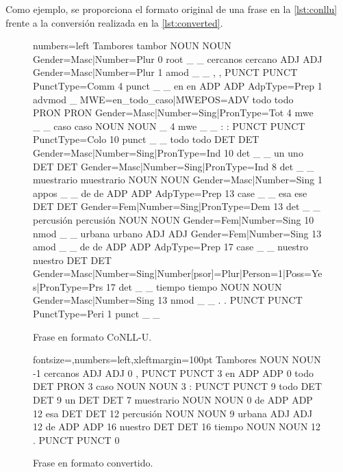Como ejemplo, se proporciona el formato original de una frase en la
\autoref{lst:conllu} frente a la conversión realizada en la
\autoref{lst:converted}.
\begin{figure}[ht]
  \begin{bashcode*}{numbers=left}
Tambores        tambor  NOUN    NOUN    Gender=Masc|Number=Plur 0       root    _       _
cercanos        cercano ADJ     ADJ     Gender=Masc|Number=Plur 1       amod    _       _
,       ,       PUNCT   PUNCT   PunctType=Comm  4       punct   _       _
en      en      ADP     ADP     AdpType=Prep    1       advmod  _       MWE=en_todo_caso|MWEPOS=ADV
todo    todo    PRON    PRON    Gender=Masc|Number=Sing|PronType=Tot    4       mwe     _       _
caso    caso    NOUN    NOUN    _       4       mwe     _       _
:       :       PUNCT   PUNCT   PunctType=Colo  10      punct   _       _
todo    todo    DET     DET     Gender=Masc|Number=Sing|PronType=Ind    10      det     _       _
un      uno     DET     DET     Gender=Masc|Number=Sing|PronType=Ind    8       det     _       _
muestrario      muestrario      NOUN    NOUN    Gender=Masc|Number=Sing 1       appos   _       _
de      de      ADP     ADP     AdpType=Prep    13      case    _       _
esa     ese     DET     DET     Gender=Fem|Number=Sing|PronType=Dem     13      det     _       _
percusión       percusión       NOUN    NOUN    Gender=Fem|Number=Sing  10      nmod    _       _
urbana  urbano  ADJ     ADJ     Gender=Fem|Number=Sing  13      amod    _       _
de      de      ADP     ADP     AdpType=Prep    17      case    _       _
nuestro nuestro DET     DET     Gender=Masc|Number=Sing|Number[psor]=Plur|Person=1|Poss=Yes|PronType=Prs        17      det     _       _
tiempo  tiempo  NOUN    NOUN    Gender=Masc|Number=Sing 13      nmod    _       _
.       .       PUNCT   PUNCT   PunctType=Peri  1       punct   _       _
  \end{bashcode*}
  \caption{Frase en formato \textsc{CoNLL-U}.}
  \label{lst:conllu}
\end{figure}
\begin{figure}[ht]
  \centering
  \begin{bashcode*}{fontsize=\scriptsize,numbers=left,xleftmargin=100pt}
Tambores        NOUN    NOUN    -1
cercanos        ADJ     ADJ     0
,       PUNCT   PUNCT   3
en      ADP     ADP     0
todo    DET     PRON    3
caso    NOUN    NOUN    3
:       PUNCT   PUNCT   9
todo    DET     DET     9
un      DET     DET     7
muestrario      NOUN    NOUN    0
de      ADP     ADP     12
esa     DET     DET     12
percusión       NOUN    NOUN    9
urbana  ADJ     ADJ     12
de      ADP     ADP     16
nuestro DET     DET     16
tiempo  NOUN    NOUN    12
.       PUNCT   PUNCT   0
  \end{bashcode*}
  \caption{Frase en formato convertido.}
  \label{lst:converted}
\end{figure}


